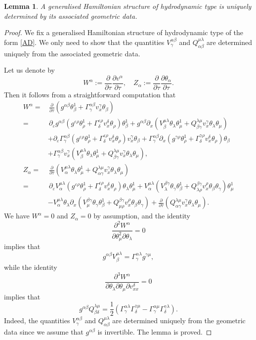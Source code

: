 \documentclass[11pt,a4paper]{amsart}
\numberwithin{equation}{section}
\newtheorem{lemma}[theorem]{Lemma}
\newcommand{\diff}[2]{\frac{\partial #1}{\partial #2}}
\newcommand{\qa}{\alpha}
\newcommand{\qb}{\beta}
\newcommand{\qd}{\delta}
\newcommand{\qg}{\gamma}
\newcommand{\qt}{\tau}
\newcommand{\qth}{\theta}
\newcommand{\qe}{\varepsilon}
\newcommand{\qp}{\partial}
\newcommand{\Qg}{\Gamma}
\newcommand{\ql}{\lambda}
\newcommand{\kk}[1]{\left(#1\right)}
\numberwithin{equation}{section}
\begin{document}
\begin{lemma}
  \label{AF}
  A generalised Hamiltonian structure of hydrodynamic type is uniquely determined by its associated geometric data.
\end{lemma}
\begin{proof}
  We fix a generalised Hamiltonian structure of hydrodynamic type of the form \eqref{AD}. We only need to show that the quantities $V^{\qa\qb}_\qg$ and $Q^{\mu\ql}_{\qa\qb}$ are determined uniquely from the associated geometric data.

Let us denote by 
\[
W^\qa:=\diff{}{\qt}\diff{v^\qa}{\qt},\quad Z_\qa:=\diff{}{\qt}\diff{\qth_\qa}{\qt}.
\]
Then it follows from a straightforward computation that 
  \begin{align*}
    W^\qa=&\,\diff{}{\qt}\kk{g^{\qa\qb}\qth_\qb^1+\Qg^{\qa\qb}_\qg v^\qg_x\qth_\qb}\\
    =&\,\qp_\qe g^{\qa\qb}\kk{g^{\qe\rho}\qth_\rho^1+\Qg^{\qe\rho}_\qd v^\qd_x\qth_\rho}\qth_\qb^1+g^{\qa\qb}\qp_x\kk{ V_\qb^{\mu\ql}\qth_\ql\qth_\mu^1+Q^{\ql\mu}_{\qb\qg}v^\qg_x\qth_\ql\qth_\mu}\\
    &+\qp_\qe\Qg^{\qa\qb}_\qg\kk{g^{\qe\rho}\qth_\rho^1+\Qg^{\qe\rho}_\qd v^\qd_x\qth_\rho}v^\qg_x\qth_\qb+\Qg^{\qa\qb}_\qg\qp_x\kk{g^{\qg\rho}\qth_\rho^1+\Qg^{\qg\rho}_\qd v^\qd_x\qth_\rho}\qth_\qb\\
    &+\Qg^{\qa\qb}_\qg v^\qg_x\kk{V_\qb^{\mu\ql}\qth_\ql\qth_\mu^1+Q^{\ql\mu}_{\qb\qg}v^\qg_x\qth_\ql\qth_\mu},\\
    Z_\qa =&\,\diff{}{\qt}\kk{V_\qa^{\mu\ql}\qth_\ql\qth_\mu^1+Q^{\ql\mu}_{\qa\qg}v^\qg_x\qth_\ql\qth_\mu}\\
    =&\,\qp_\qe V^{\mu\ql}_\qa\kk{g^{\qe\rho}\qth_\rho^1+\Qg^{\qe\rho}_\qd v^\qd_x\qth_\rho}\qth_\ql\qth_\mu^1+V^{\mu\ql}_\qa\kk{V_\ql^{\qb\qg}\qth_\qg\qth_\qb^1+Q_{\ql\rho}^{\qb\qg}v^\rho_x\qth_\qb\qth_\qg}\qth_\mu^1\\
    &-V^{\mu\ql}_\qa\qth_\ql\qp_x\kk{V_\mu^{\qb\qg}\qth_\qg\qth_\qb^1+Q_{\mu\rho}^{\qb\qg}v^\rho_x\qth_\qb\qth_\qg}+\diff{}{\qt}\kk{Q^{\ql\mu}_{\qa\qg}v^\qg_x\qth_\ql\qth_\mu}.
\end{align*}
We have $W^\qa = 0$ and $Z_\qa = 0$ by assumption, and the identity 
\[
\frac{\qp^2W^\qa}{\qp\qth_\mu^2\qp\qth_\ql} = 0
\]
implies that 
\begin{equation}
  \label{AL}
g^{\qa\qb}V_\qb^{\mu\ql} = \Qg^{\qa\ql}_\qg g^{\qg\mu},
\end{equation}
while the identity
\[
\frac{\qp^3 W^\qa}{\qp\qth_\ql\qp\qth_\mu\qp v^\qd_{xx}} = 0
\]
implies that 
\begin{equation}
  \label{AZ}
g^{\qa\qb}Q^{\ql\mu}_{\qb\qd} = \frac12\kk{\Qg^{\qa\ql}_\qg\Qg^{\qg\mu}_\qd-\Qg^{\qa\mu}_\qg\Qg^{\qg\ql}_\qd}.
\end{equation}
Indeed, the quantities $V^{\qa\qb}_\qg$ and $Q^{\mu\ql}_{\qa\qb}$ are determined uniquely from the geometric data since we assume that $g^{\qa\qb}$ is invertible. The lemma is proved.
\end{proof}
\end{document}
